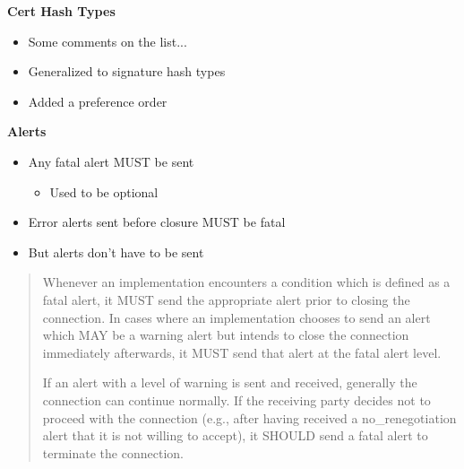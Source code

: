\documentclass[helvetica,fancybox,landscape]{seminar}
\newcommand{\heading}[1]{%
  \begin{center} 
    \large\bf 
    #1 
  \end{center} 
  \vspace{.4 in}}
\begin{document}
\begin{slide}
\heading{Cert Hash Types}

\begin{itemize}
\item Some comments on the list...
\item Generalized to signature hash types
\item Added a preference order
\end{itemize}

\end{slide}


\begin{slide}
\heading{Alerts}

\begin{itemize}
\item Any fatal alert MUST be sent
\begin{itemize}
\item Used to be optional
\end{itemize}
\item Error alerts sent before closure MUST be fatal
\item But alerts don't have to be sent
\end{itemize}

\begin{quote}
\tiny{
Whenever an implementation encounters a condition which is defined as
a fatal alert, it MUST send the appropriate alert prior to closing
the connection. In cases where an implementation chooses to send an
alert which MAY be a warning alert but intends to close the
connection immediately afterwards, it MUST send that alert at the
fatal alert level.

If an alert with a level of warning is sent and received, generally
the connection can continue normally.  If the receiving party decides
not to proceed with the connection (e.g., after having received a
no\_renegotiation alert that it is not willing to accept), it SHOULD
send a fatal alert to terminate the connection.
}
\end{quote}
\end{slide}
\end{document}
